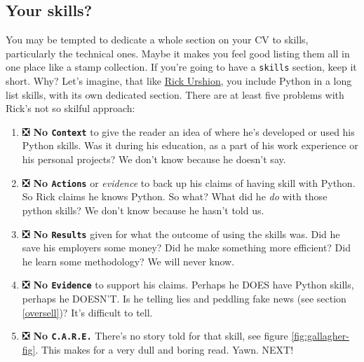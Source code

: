 \documentclass[
]{book}
\providecommand{\tightlist}{%
  \setlength{\itemsep}{0pt}\setlength{\parskip}{0pt}}
\begin{document}
\hypertarget{mycvsk}{%
\subsection{Your skills?}\label{mycvsk}}

You may be tempted to dedicate a whole section on your CV to skills, particularly the technical ones. Maybe it makes you feel good listing them all in one place like a stamp collection. If you're going to have a \texttt{skills} section, keep it short. Why? Let's imagine, that like \href{Rick_Urshion.pdf}{Rick Urshion}, you include Python in a long list skills, with its own dedicated section. There are at least five problems with Rick's not so skilful approach:

\begin{enumerate}
\def\labelenumi{\arabic{enumi}.}
\tightlist
\item
  ❎ \textbf{No \texttt{Context}} to give the reader an idea of where he's developed or used his Python skills. Was it during his education, as a part of his work experience or his personal projects? We don't know because he doesn't say.\\
\item
  ❎ \textbf{No \texttt{Actions}} or \emph{evidence} to back up his claims of having skill with Python. So Rick claims he knows Python. So what? What did he \emph{do} with those python skills? We don't know because he hasn't told us.
\item
  ❎ \textbf{No \texttt{Results}} given for what the outcome of using the skills was. Did he save his employers some money? Did he make something more efficient? Did he learn some methodology? We will never know.\\
\item
  ❎ \textbf{No \texttt{Evidence}} to support his claims. Perhaps he DOES have Python skills, perhaps he DOESN'T. Is he telling lies and peddling fake news (see section \ref{oversell})? It's difficult to tell.
\item
  ❎ \textbf{No \texttt{C.A.R.E.}} There's no story told for that skill, see figure \ref{fig:gallagher-fig}. This makes for a very dull and boring read. Yawn. NEXT! 🥱
\end{enumerate}
\end{document}
